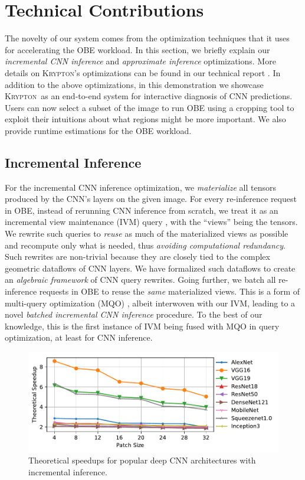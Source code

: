 \documentclass{vldb}
\newcommand{\system}{\textsc{Krypton}}
\begin{document}
\section{Technical Contributions}
The novelty of our system comes from the optimization techniques that it uses for accelerating the OBE workload.
In this section, we briefly explain our \textit{incremental CNN inference} and \textit{approximate inference} optimizations.
More details on \system's optimizations can be found in our technical report \cite{krypton}.
In addition to the above optimizations, in this demonstration we showcase \system~as an end-to-end system for interactive diagnosis of CNN predictions.
Users can now select a subset of the image to run OBE using a cropping tool to exploit their intuitions about what regions might be more important.
We also provide runtime estimations for the OBE workload. 


\subsection{Incremental Inference}
For the incremental CNN inference optimization, we \textit{materialize} all tensors produced by the CNN's layers on the given image. For every re-inference request in OBE, instead of rerunning CNN inference from scratch, we treat it as an incremental view maintenance (IVM) query \cite{chirkova2012materialized}, with the ``views'' being the tensors. We rewrite such queries to \textit{reuse} as much of the materialized views as possible and recompute only what is needed, thus \textit{avoiding computational redundancy}. Such rewrites are non-trivial because they are closely tied to the complex geometric dataflows of CNN layers. We have formalized such dataflows to create an \textit{algebraic framework} of CNN query rewrites. Going further, we batch all re-inference requests in OBE to reuse the \textit{same} materialized views. This is a form of multi-query optimization (MQO) \cite{sellis1988multiple}, albeit interwoven with our IVM, leading to a novel \textit{batched incremental CNN inference} procedure. To the best of our knowledge, this is the first instance of IVM being fused with MQO in query optimization, at least for CNN inference.

\begin{figure}
\includegraphics[width=\columnwidth]{images/redundancy_ratio.pdf}
\caption{Theoretical speedups for popular deep CNN architectures with incremental inference.}
\label{fig:theoretical_speedups}
\vspace{-2mm}
\end{figure}
\end{document}
